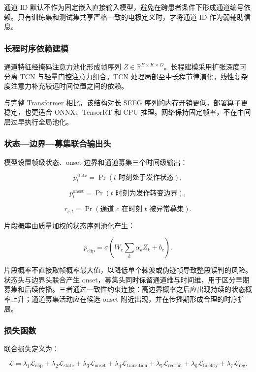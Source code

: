 \documentclass{cumcmthesis_v2}
\numberwithin{figure}{section} %
\numberwithin{table}{section} %
\begin{document}
通道 ID 默认不作为固定嵌入直接输入模型，避免在跨患者条件下形成通道编号依赖。只有训练集和测试集共享严格一致的电极定义时，才将通道 ID 作为弱辅助信息。

\subsubsection{长程时序依赖建模}

通道特征经掩码注意力池化形成帧序列 $Z\in\mathbb{R}^{B\times K\times D}$。长程建模采用扩张深度可分离 TCN 与轻量门控注意力组合。TCN 处理局部至中长程节律演化，线性复杂度注意力补充较远时间位置之间的依赖。

与完整 Transformer 相比，该结构对长 SEEG 序列的内存开销更低，部署算子更稳定，也更适合 ONNX、TensorRT 和 CPU 推理。网络保持固定帧率，不在中间层过早执行全局池化。

\subsubsection{状态—边界—募集联合输出头}

模型设置帧级状态、onset 边界和通道募集三个时间级输出：

$$
p_t^{\mathrm{state}}=\Pr(t\text{ 时刻处于发作状态}),
$$

$$
p_t^{\mathrm{onset}}=\Pr(t\text{ 时刻为发作转变边界}),
$$

$$
r_{c,t}=\Pr(\text{通道 }c\text{ 在时刻 }t\text{ 被异常募集}).
$$

片段概率由质量加权的状态序列池化产生：

$$
p_{\mathrm{clip}}=
\sigma\left(
W_c\sum_k\alpha_kZ_k+b_c
\right).
$$

片段概率不直接取帧概率最大值，以降低单个棘波或伪迹帧导致整段误判的风险。状态头与边界头联合产生 onset，募集头同时保留通道维与时间维，用于区分早期募集和后续传播。三者通过一致性约束连接：高边界概率之后应出现持续的状态概率上升；通道募集活动应在候选 onset 附近出现，并在传播期形成合理的时序扩展。

\subsubsection{损失函数}

联合损失定义为：

$$
\mathcal{L}=
\lambda_1\mathcal{L}_{\mathrm{clip}}
+\lambda_2\mathcal{L}_{\mathrm{state}}
+\lambda_3\mathcal{L}_{\mathrm{onset}}
+\lambda_4\mathcal{L}_{\mathrm{transition}}
+\lambda_5\mathcal{L}_{\mathrm{recruit}}
+\lambda_6\mathcal{L}_{\mathrm{fidelity}}
+\lambda_7\mathcal{L}_{\mathrm{reg}}.
$$
\end{document}
